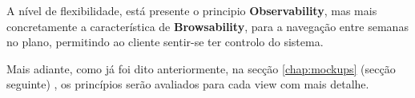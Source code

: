 \hspace{5mm} A nível de flexibilidade, está presente o principio \textbf{Observability}, mas mais concretamente a característica de \textbf{Browsability}, para a navegação entre semanas no plano, permitindo ao cliente sentir-se ter controlo do sistema.

\hspace{5mm} Mais adiante, como já foi dito anteriormente, na secção \ref{chap:mockups} (secção seguinte) , os princípios serão avaliados para cada view com mais detalhe.

